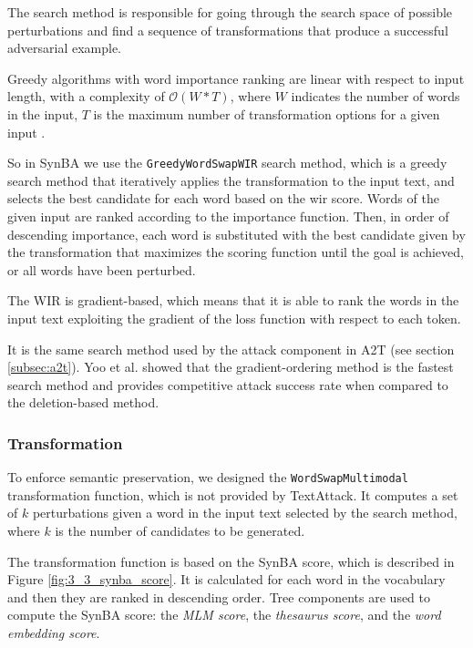 The search method is responsible for going through the search space of possible perturbations and  find a sequence of transformations that produce a successful adversarial example.

Greedy algorithms with word importance ranking are linear with respect to input length, with a complexity of $\mathcal{O}(W*T)$, where $W$ indicates the number of words in the input, $T$ is the maximum number of transformation options for a given input \cite{journals/corr/abs-2009-06368}. 

So in SynBA we use the \texttt{GreedyWordSwapWIR} search method, which is a greedy search method that iteratively applies the transformation to the input text, and selects the best candidate for each word based on the \acrfull{wir} score.
Words of the given input are ranked according to the importance function. Then, in order of descending importance, each word is substituted with the best candidate given by the transformation
that maximizes the scoring function until the goal is achieved, or all words have been perturbed.

The WIR is gradient-based, which means that it is able to rank the words in the input text exploiting the gradient of the loss function with respect to each token.

It is the same search method used by the attack component in A2T (see section \ref{subsec:a2t}).
Yoo et al. \cite{journals/corr/abs-2009-06368} showed that the gradient-ordering method is the fastest search method and provides competitive attack success rate when compared to the deletion-based method.

\subsubsection{Transformation}\label{subsubsec:transformation}

To enforce semantic preservation, we designed the \texttt{WordSwapMultimodal} transformation function, which is not provided by TextAttack.
It computes a set of $k$ perturbations given a word in the input text selected by the search method, where $k$ is the number of candidates to be generated.

The transformation function is based on the SynBA score, which is described in Figure \ref{fig:3_3_synba_score}.
It is calculated for each word in the vocabulary and then they are ranked in descending order.
Tree components are used to compute the SynBA score: the \emph{MLM score}, the \emph{thesaurus score}, and the \emph{word embedding score}.

